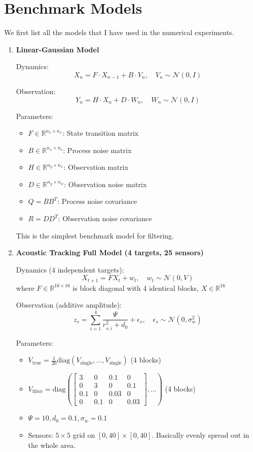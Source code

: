 \documentclass{article}
\begin{document}
\newpage
\appendix

\section{Benchmark Models}\label{app:benchmark_models}


We first list all the models that I have used in the numerical experiments.
\begin{enumerate}

\item \textbf{Linear-Gaussian Model}

Dynamics:
\[ X_n = F \cdot X_{n-1} + B \cdot V_n, \quad V_n \sim \mathcal{N}(0, I) \]

Observation:
\[ Y_n = H \cdot X_n + D \cdot W_n, \quad W_n \sim \mathcal{N}(0, I) \]

Parameters:
\begin{itemize}
\item $F \in \mathbb{R}^{n_x \times n_x}$: State transition matrix
\item $B \in \mathbb{R}^{n_x \times n_v}$: Process noise matrix
\item $H \in \mathbb{R}^{n_y \times n_x}$: Observation matrix
\item $D \in \mathbb{R}^{n_y \times n_w}$: Observation noise matrix
\item $Q = BB^T$: Process noise covariance
\item $R = DD^T$: Observation noise covariance
\end{itemize}
This is the simplest benchmark model for filtering. 


\item \textbf{Acoustic Tracking Full Model (4 targets, 25 sensors)}

Dynamics (4 independent targets):
\[ X_{t+1} = F X_t + w_t, \quad w_t \sim \mathcal{N}(0, V) \]
where $F \in \mathbb{R}^{16 \times 16}$ is block diagonal with 4 identical blocks, $X \in \mathbb{R}^{16}$

Observation (additive amplitude):
\[ z_s = \sum_{i=1}^{4} \frac{\Psi}{r_{s,i}^2 + d_0} + \epsilon_s, \quad \epsilon_s \sim \mathcal{N}(0, \sigma_w^2) \]

Parameters:
\begin{itemize}
\item $V_{\text{true}} = \frac{1}{20} \text{diag}(V_{\text{single}}, \ldots, V_{\text{single}})$ (4 blocks)
\item $V_{\text{filter}} = \text{diag}(\begin{bmatrix} 3 & 0 & 0.1 & 0 \\ 0 & 3 & 0 & 0.1 \\ 0.1 & 0 & 0.03 & 0 \\ 0 & 0.1 & 0 & 0.03 \end{bmatrix}, \ldots)$ (4 blocks)
\item $\Psi = 10, d_0 = 0.1, \sigma_w = 0.1$
\item Sensors: $5 \times 5$ grid on $[0, 40] \times [0, 40]$. Basically evenly spread out in the whole area. 
\end{itemize}





\end{enumerate}
\end{document}
